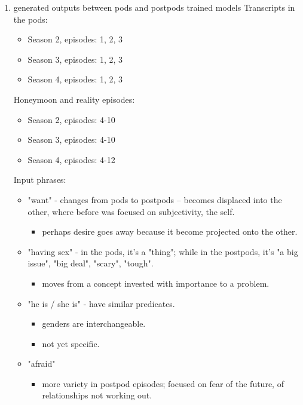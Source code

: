 \documentclass[11pt]{article}
\begin{document}
\begin{enumerate}
\item generated outputs between pods and postpods trained models
\label{sec:org3450d70}
Transcripts in the pods:
\begin{itemize}
\item Season 2, episodes: 1, 2, 3
\item Season 3, episodes: 1, 2, 3
\item Season 4, episodes: 1, 2, 3
\end{itemize}

Honeymoon and reality episodes:
\begin{itemize}
\item Season 2, episodes: 4-10
\item Season 3, episodes: 4-10
\item Season 4, episodes: 4-12
\end{itemize}

Input phrases:
\begin{itemize}
\item "want" - changes from pods to postpods -- becomes displaced into the
other, where before was focused on subjectivity, the self.
\begin{itemize}
\item perhaps desire goes away because it become projected onto the
other.
\end{itemize}
\item "having sex" - in the pods, it's a "thing"; while in the postpods,
it's "a big issue", "big deal", "scary", "tough". 
\begin{itemize}
\item moves from a concept invested with importance to a problem.
\end{itemize}
\item "he is / she is" - have similar predicates.
\begin{itemize}
\item genders are interchangeable.
\item not yet specific.
\end{itemize}
\item "afraid"
\begin{itemize}
\item more variety in postpod episodes; focused on fear of the future,
of relationships not working out.
\end{itemize}
\end{itemize}
\end{enumerate}
\end{document}
